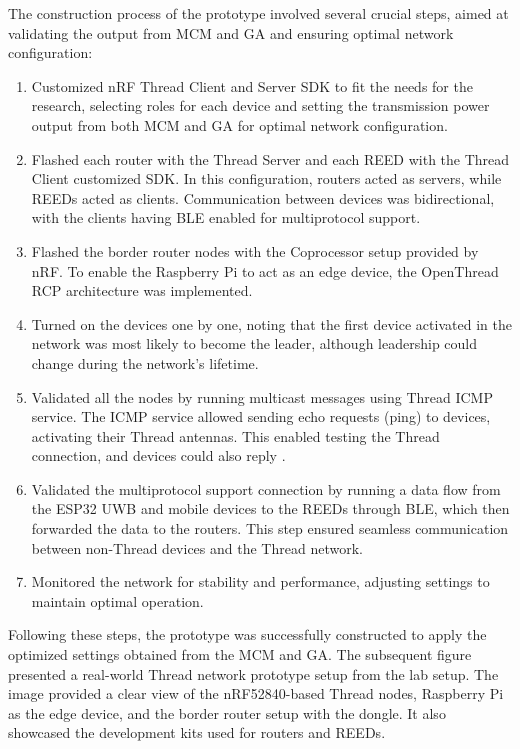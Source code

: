 The construction process of the prototype involved several crucial steps, aimed at validating the output from \gls{MCM} and \gls{GA} and ensuring optimal network configuration:

\begin{enumerate}
    \item Customized \gls{nRF} Thread Client and Server \gls{SDK} to fit the needs for the research, selecting roles for each device and setting the transmission power output from both \gls{MCM} and \gls{GA} for optimal network configuration.
    \item Flashed each router with the Thread Server and each \gls{REED} with the Thread Client customized \gls{SDK}. In this configuration, routers acted as servers, while \glspl{REED} acted as clients. Communication between devices was bidirectional, with the clients having \gls{BLE} enabled for multiprotocol support.
    \item Flashed the border router nodes with the Coprocessor setup provided by \gls{nRF}. To enable the Raspberry Pi to act as an edge device, the OpenThread \gls{RCP} architecture was implemented.
    \item Turned on the devices one by one, noting that the first device activated in the network was most likely to become the leader, although leadership could change during the network's lifetime.
    \item Validated all the nodes by running multicast messages using Thread \gls{ICMP} service. The \gls{ICMP} service allowed sending echo requests (ping) to devices, activating their Thread antennas. This enabled testing the Thread connection, and devices could also reply \cite{Thread_Group_Fundamentals}.
    \item Validated the multiprotocol support connection by running a data flow from the ESP32 \gls{UWB} and mobile devices to the \glspl{REED} through \gls{BLE}, which then forwarded the data to the routers. This step ensured seamless communication between non-Thread devices and the Thread network.
    \item Monitored the network for stability and performance, adjusting settings to maintain optimal operation.
\end{enumerate}

Following these steps, the prototype was successfully constructed to apply the optimized settings obtained from the \gls{MCM} and \gls{GA}. The subsequent figure presented a real-world Thread network prototype setup from the lab setup. The image provided a clear view of the \gls{nRF}52840-based Thread nodes, Raspberry Pi as the edge device, and the border router setup with the dongle. It also showcased the development kits used for routers and \glspl{REED}.

